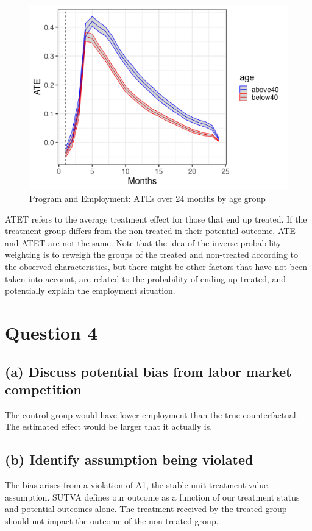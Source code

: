 \documentclass{scrartcl}
\begin{document}
\begin{figure}
    \centering
    \includegraphics[width=0.7\linewidth]{output/figures/1_ATEs_over_24_months_by_age_group.png}
    \caption{Program and Employment: ATEs over 24 months by age group}
    \label{fig:ATE}
\end{figure}

ATET refers to the average treatment effect for those that end up treated. If the treatment group differs from the non-treated in their potential outcome, ATE and ATET are not the same. Note that the idea of the inverse probability weighting is to reweigh the groups of the treated and non-treated according to the observed characteristics, but there might be other factors that have not been taken into account, are related to the probability of ending up treated, and potentially explain the employment situation.   

\section*{Question 4}

\subsection*{(a) Discuss potential bias from labor market competition}

The control group would have lower employment than the true counterfactual. The estimated effect would be larger that it actually is. 

\subsection*{(b) Identify assumption being violated}

The bias arises from a violation of A1, the stable unit treatment value assumption. SUTVA defines our outcome as a function of our treatment status and potential outcomes alone. The treatment received by the treated group should not impact the outcome of the non-treated group.
\end{document}
